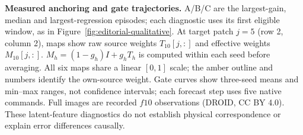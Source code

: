 \textbf{Measured anchoring and gate trajectories.} A/B/C are the largest-gain, median and largest-regression episodes; each diagnostic uses its first eligible window, as in Figure~\ref{fig:editorial-qualitative}. At target patch $j=5$ (row 2, column 2), maps show raw source weights $T_{10}[j,:]$ and effective weights $M_{10}[j,:]$. $M_h=(1-g_h)I+g_hT_h$ is computed within each seed before averaging. All six maps share a linear $[0,1]$ scale; the amber outline and numbers identify the own-source weight. Gate curves show three-seed means and min--max ranges, not confidence intervals; each forecast step uses five native commands. Full images are recorded $f10$ observations (DROID, CC BY 4.0). These latent-feature diagnostics do not establish physical correspondence or explain error differences causally.
